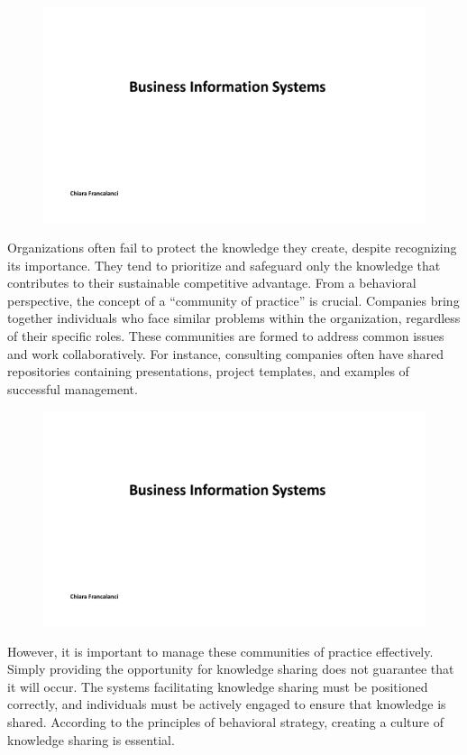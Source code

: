 \begin{figure}[!h]
    \centering
    \includegraphics[page=12, trim = 1.4cm 5cm 1.5cm 3.7cm, clip, width=\textwidth]{images/05 - KM.pdf}
\end{figure}

Organizations often fail to protect the knowledge they create, despite
recognizing its importance. They tend to prioritize and safeguard only
the knowledge that contributes to their sustainable competitive
advantage. From a behavioral perspective, the concept of a ``community
of practice'' is crucial. Companies bring together individuals who face
similar problems within the organization, regardless of their specific
roles. These communities are formed to address common issues and work
collaboratively. For instance, consulting companies often have shared
repositories containing presentations, project templates, and examples
of successful management.

\begin{figure}[!h]
    \centering
    \includegraphics[page=13, trim = 1.3cm 5.5cm 1.5cm 2.5cm, clip, width=\textwidth]{images/05 - KM.pdf}
\end{figure}

However, it is important to manage these
communities of practice effectively. Simply providing the opportunity
for knowledge sharing does not guarantee that it will occur. The systems
facilitating knowledge sharing must be positioned correctly, and
individuals must be actively engaged to ensure that knowledge is shared.
According to the principles of behavioral strategy, creating a culture
of knowledge sharing is essential.

